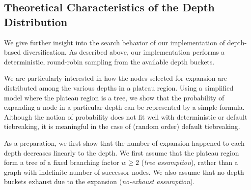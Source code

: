 
\subsection{Theoretical Characteristics of the Depth Distribution}
\label{sec:theoretical-characteristics}

We give further insight into the search behavior of our implementation
of depth-based diversification.
As described above, our implementation performs a deterministic, round-robin sampling from the available depth buckets.

We are particularly interested in how the nodes selected for expansion are distributed 
among the various depths in a plateau region.
Using a simplified model where the plateau region is a tree,
we show that the probability of expanding a node in a particular depth
can be represented by a simple formula.  Although the notion of
probability does not fit well with deterministic \fifo or \lifo
default tiebreaking, it is meaningful in the case of \ro (random
order) default tiebreaking.


As a preparation, we first show that the number of expansion happened to each depth decreases
linearly to the depth.
% 
We first assume that the plateau region form a tree of a fixed branching factor
$w\geq 2$ (\emph{tree assumption}), rather than a graph with indefinite number of successor nodes.
We also assume that no depth buckets exhaust due to the expansion (\emph{no-exhaust assumption}).

